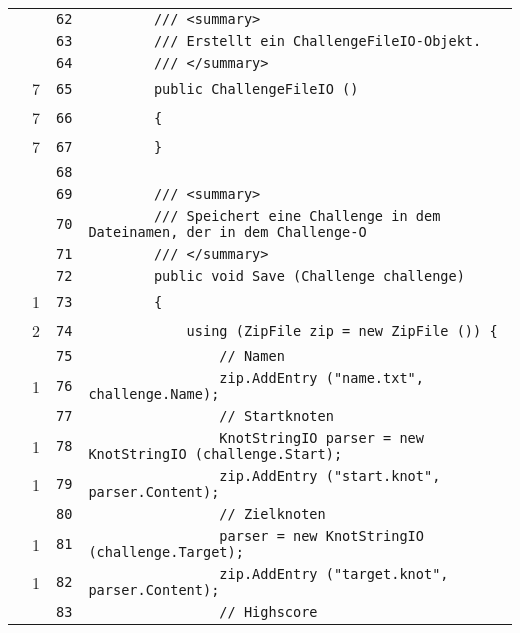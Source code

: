 \documentclass[a4paper,10pt]{article}
\begin{document}
\begin{longtable}[l]{lrrl}
\cellcolor{gray} &  & \verb~62~ & \verb~        /// <summary>~\\
\cellcolor{gray} &  & \verb~63~ & \verb~        /// Erstellt ein ChallengeFileIO-Objekt.~\\
\cellcolor{gray} &  & \verb~64~ & \verb~        /// </summary>~\\
\cellcolor{green} & 7 & \verb~65~ & \verb~        public ChallengeFileIO ()~\\
\cellcolor{green} & 7 & \verb~66~ & \verb~        {~\\
\cellcolor{green} & 7 & \verb~67~ & \verb~        }~\\
\cellcolor{gray} &  & \verb~68~ & \verb~~\\
\cellcolor{gray} &  & \verb~69~ & \verb~        /// <summary>~\\
\cellcolor{gray} &  & \verb~70~ & \verb~        /// Speichert eine Challenge in dem Dateinamen, der in dem Challenge-O~\\
\cellcolor{gray} &  & \verb~71~ & \verb~        /// </summary>~\\
\cellcolor{gray} &  & \verb~72~ & \verb~        public void Save (Challenge challenge)~\\
\cellcolor{green} & 1 & \verb~73~ & \verb~        {~\\
\cellcolor{green} & 2 & \verb~74~ & \verb~            using (ZipFile zip = new ZipFile ()) {~\\
\cellcolor{gray} &  & \verb~75~ & \verb~                // Namen~\\
\cellcolor{green} & 1 & \verb~76~ & \verb~                zip.AddEntry ("name.txt", challenge.Name);~\\
\cellcolor{gray} &  & \verb~77~ & \verb~                // Startknoten~\\
\cellcolor{green} & 1 & \verb~78~ & \verb~                KnotStringIO parser = new KnotStringIO (challenge.Start);~\\
\cellcolor{green} & 1 & \verb~79~ & \verb~                zip.AddEntry ("start.knot", parser.Content);~\\
\cellcolor{gray} &  & \verb~80~ & \verb~                // Zielknoten~\\
\cellcolor{green} & 1 & \verb~81~ & \verb~                parser = new KnotStringIO (challenge.Target);~\\
\cellcolor{green} & 1 & \verb~82~ & \verb~                zip.AddEntry ("target.knot", parser.Content);~\\
\cellcolor{gray} &  & \verb~83~ & \verb~                // Highscore~\\

\end{longtable}
\end{document}
